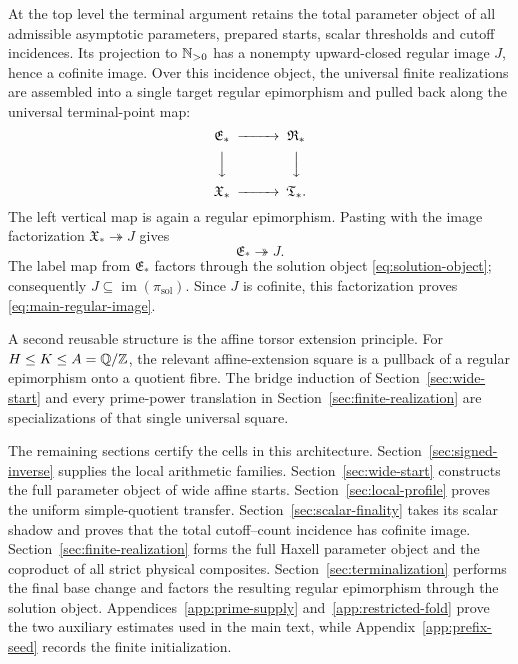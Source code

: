 At the top level the terminal argument retains the total parameter object of all admissible asymptotic parameters, prepared starts, scalar thresholds and cutoff incidences.  Its projection to $\mathbb N_{>0}$ has a nonempty upward-closed regular image $J$, hence a cofinite image.  Over this incidence object, the universal finite realizations are assembled into a single target regular epimorphism and pulled back along the universal terminal-point map:
\begin{equation}\label{eq:master-terminal-pullback}
\begin{CD}
\mathfrak E_* @>>> \mathfrak R_*\\
@VVV @VVV\\
\mathfrak X_* @>>> \mathfrak T_*.
\end{CD}
\end{equation}
The left vertical map is again a regular epimorphism.  Pasting with the image factorization $\mathfrak X_*\twoheadrightarrow J$ gives
\[
\mathfrak E_*\twoheadrightarrow J.
\]
The label map from $\mathfrak E_*$ factors through the solution object \eqref{eq:solution-object}; consequently $J\subseteq\operatorname{im}(\pi_{\mathrm{sol}})$.  Since $J$ is cofinite, this factorization proves \eqref{eq:main-regular-image}.

A second reusable structure is the affine torsor extension principle.  For $H\le K\le A=\mathbb Q/\mathbb Z$, the relevant affine-extension square is a pullback of a regular epimorphism onto a quotient fibre.  The bridge induction of Section~\ref{sec:wide-start} and every prime-power translation in Section~\ref{sec:finite-realization} are specializations of that single universal square.

The remaining sections certify the cells in this architecture.  Section~\ref{sec:signed-inverse} supplies the local arithmetic families.  Section~\ref{sec:wide-start} constructs the full parameter object of wide affine starts.  Section~\ref{sec:local-profile} proves the uniform simple-quotient transfer.  Section~\ref{sec:scalar-finality} takes its scalar shadow and proves that the total cutoff--count incidence has cofinite image.  Section~\ref{sec:finite-realization} forms the full Haxell parameter object and the coproduct of all strict physical composites.  Section~\ref{sec:terminalization} performs the final base change and factors the resulting regular epimorphism through the solution object.  Appendices~\ref{app:prime-supply} and~\ref{app:restricted-fold} prove the two auxiliary estimates used in the main text, while Appendix~\ref{app:prefix-seed} records the finite initialization.

